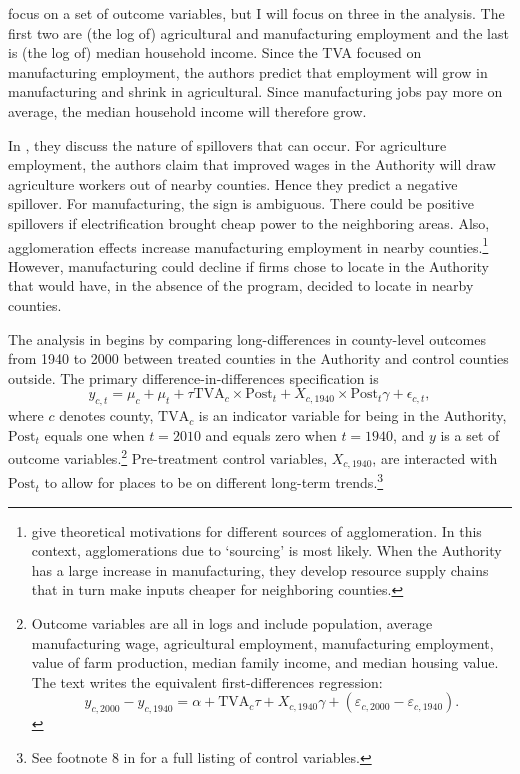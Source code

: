 \documentclass[11pt]{article}
\begin{document}
\citet{Kline_Moretti_2014} focus on a set of outcome variables, but I will focus on three in the analysis. The first two are (the log of) agricultural and manufacturing employment and the last is (the log of) median household income. Since the TVA focused on manufacturing employment, the authors predict that employment will grow in manufacturing and shrink in agricultural. Since manufacturing jobs pay more on average, the median household income will therefore grow. 

In \citet{Kline_Moretti_2014}, they discuss the nature of spillovers that can occur. For agriculture employment, the authors claim that improved wages in the Authority will draw agriculture workers out of nearby counties. Hence they predict a negative spillover. For manufacturing, the sign is ambiguous. There could be positive spillovers if electrification brought cheap power to the neighboring areas. Also, agglomeration effects increase manufacturing employment in nearby counties.\footnote{\citet{Duranton_Puga_2003} give theoretical motivations for different sources of agglomeration. In this context, agglomerations due to `sourcing' is most likely. When the Authority has a large increase in manufacturing, they develop resource supply chains that in turn make inputs cheaper for neighboring counties.} However, manufacturing could decline if firms chose to locate in the Authority that would have, in the absence of the program, decided to locate in nearby counties. 

The analysis in \citet{Kline_Moretti_2014} begins by comparing long-differences in county-level outcomes from 1940 to 2000 between treated counties in the Authority and control counties outside. The primary difference-in-differences specification is
\begin{equation}\label{eq:tva}
    y_{c, t} = \mu_c + \mu_t + \tau \text{TVA}_c \times \text{Post}_t + X_{c, 1940} \times \text{Post}_t \gamma + \epsilon_{c,t},
\end{equation}
where $c$ denotes county, $\text{TVA}_c$ is an indicator variable for being in the Authority, $\text{Post}_t$ equals one when $t = 2010$ and equals zero when $t = 1940$, and $y$ is a set of outcome variables.\footnote{Outcome variables are all in logs and include population, average manufacturing wage, agricultural employment, manufacturing employment, value of farm production, median family income, and median housing value. The text writes the equivalent first-differences regression: \[ 
    y_{c, 2000} - y_{c, 1940} = \alpha + \text{TVA}_c \tau + X_{c, 1940} \gamma + (\varepsilon_{c, 2000} - \varepsilon_{c, 1940}). 
\]} Pre-treatment control variables, $X_{c,1940}$, are interacted with $\text{Post}_t$ to allow for places to be on different long-term trends.\footnote{See footnote 8 in \citet{Kline_Moretti_2014} for a full listing of control variables.} 
\end{document}
